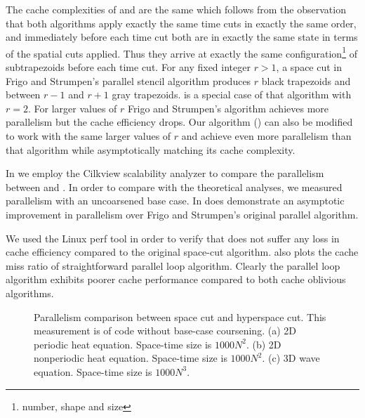 The cache complexities of  and  
are the same which follows from the observation that
both algorithms apply exactly the same time cuts
in exactly the same order, and immediately before 
each time cut both are in exactly the same state 
in terms of the spatial cuts applied.
%
Thus they arrive at exactly the
same configuration\footnote{number, shape and size} 
of subtrapezoids before each time cut.
For any fixed integer $r > 1$, a space cut in 
Frigo and Strumpen's parallel stencil algorithm 
produces $r$ black trapezoids and between $r - 1$
and $r + 1$ gray trapezoids.  is
a special case of that algorithm with $r = 2$.
For larger values of $r$ Frigo and Strumpen's algorithm
achieves more parallelism but the cache efficiency
drops. Our algorithm () can also be
modified to work with the same larger values of $r$
and achieve even more parallelism than that
algorithm while asymptotically matching its 
cache complexity.


In  we employ the Cilkview scalability analyzer
\cite{YuxiongLe10} to compare the parallelism between  and
.  In order to compare with the theoretical analyses, we
measured parallelism with an uncoarsened base case.
In   does demonstrate an asymptotic improvement in
parallelism over Frigo and Strumpen's original parallel algorithm.

We used the Linux perf tool \cite{perf} in order to verify that
 does not suffer any loss in cache efficiency compared to
the original space-cut algorithm.  also plots
the cache miss ratio of straightforward parallel loop
algorithm. Clearly the parallel loop algorithm exhibits poorer cache
performance compared to both cache oblivious algorithms.

\begin{figure}
\centering
\subfigure[]{}
\label{fig:heat2DPSpan}

\subfigure[]{}
\label{fig:heat2DNPSpan}

\subfigure[]{}
\label{fig:dfdSpan}

\caption{Parallelism comparison between space cut and hyperspace cut.   This measurement is of code without base-case coursening.
 (a) 2D periodic heat equation.  Space-time size is $1000N^2$.
 (b) 2D nonperiodic heat equation. Space-time size is $1000N^2$.
 (c) 3D wave equation.   Space-time size is $1000N^3$.
}
\label{fig:Parallelism}
\end{figure}

